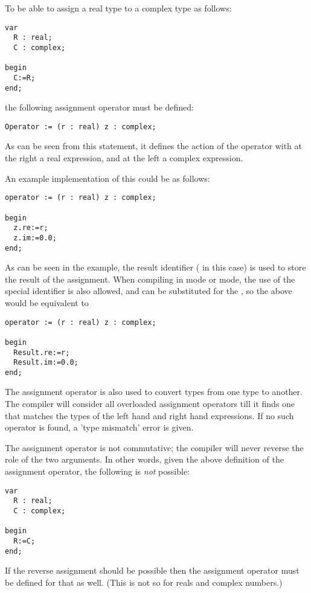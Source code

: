 To be able to assign a real type to a complex type as follows:
\begin{verbatim}
var
  R : real;
  C : complex;

begin
  C:=R;
end;
\end{verbatim}
the following assignment operator must be defined:
\begin{verbatim}
Operator := (r : real) z : complex;
\end{verbatim}
As can be seen from this statement, it defines the action of the operator
\var{:=} with at the right a real expression, and at the left a complex
expression.

An example implementation of this could be as follows:
\begin{verbatim}
operator := (r : real) z : complex;

begin
  z.re:=r;
  z.im:=0.0;
end;
\end{verbatim}
As can be seen in the example, the result identifier ( in this case)
is used to store the result of the assignment. When compiling in  mode
or  mode, the use of the special identifier  is also
allowed, and can be substituted for the , so the above would be
equivalent to
\begin{verbatim}
operator := (r : real) z : complex;

begin
  Result.re:=r;
  Result.im:=0.0;
end;
\end{verbatim}

The assignment operator is also used to convert types from one type to
another. The compiler will consider all overloaded assignment operators
till it finds one that matches the types of the left hand and right hand
expressions. If no such operator is found, a 'type mismatch' error
is given.

\begin{remark}
The assignment operator is not commutative; the compiler will never reverse
the role of the two arguments. In other words, given the above definition of
the assignment operator, the following is {\em not} possible:
\begin{verbatim}
var
  R : real;
  C : complex;

begin
  R:=C;
end;
\end{verbatim}
If the reverse assignment should be possible then the assignment operator 
must be defined for that as well.
(This is not so for reals and complex numbers.)
\end{remark}

